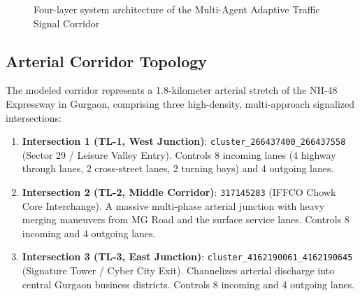 \begin{figure}[htbp]
\caption{Four-layer system architecture of the Multi-Agent Adaptive Traffic Signal Corridor}
\label{fig:ch3_system_arch}
\end{figure}

\subsection{Arterial Corridor Topology}
The modeled corridor represents a 1.8-kilometer arterial stretch of the NH-48 Expressway in Gurgaon, comprising three high-density, multi-approach signalized intersections:
\begin{enumerate}
    \item \textbf{Intersection 1 (TL-1, West Junction)}: \texttt{cluster\_266437400\_266437558} (Sector 29 / Leisure Valley Entry). Controls 8 incoming lanes (4 highway through lanes, 2 cross-street lanes, 2 turning bays) and 4 outgoing lanes.
    \item \textbf{Intersection 2 (TL-2, Middle Corridor)}: \texttt{317145283} (IFFCO Chowk Core Interchange). A massive multi-phase arterial junction with heavy merging maneuvers from MG Road and the surface service lanes. Controls 8 incoming and 4 outgoing lanes.
    \item \textbf{Intersection 3 (TL-3, East Junction)}: \texttt{cluster\_4162190061\_4162190645} (Signature Tower / Cyber City Exit). Channelizes arterial discharge into central Gurgaon business districts. Controls 8 incoming and 4 outgoing lanes.
\end{enumerate}

